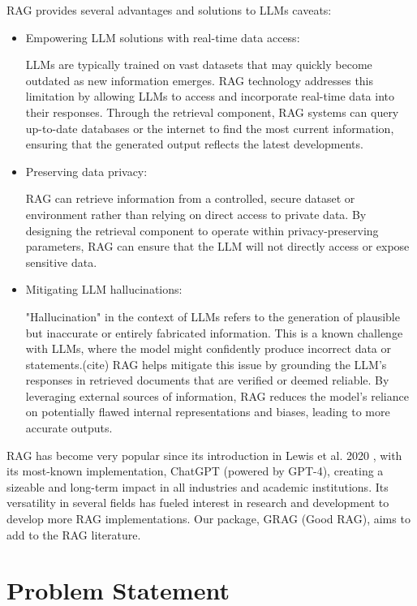 \documentclass{scrartcl}
\begin{document}
RAG provides several advantages and solutions to LLMs caveats:
\begin{itemize}
	\item Empowering LLM solutions with real-time data access:

	LLMs are typically trained on vast datasets that may quickly become outdated as new information emerges. RAG technology addresses this limitation by allowing LLMs to access and incorporate real-time data into their responses. Through the retrieval component, RAG systems can query up-to-date databases or the internet to find the most current information, ensuring that the generated output reflects the latest developments.
	\item Preserving data privacy:

	RAG can retrieve information from a controlled, secure dataset or environment rather than relying on direct access to private data. By designing the retrieval component to operate within privacy-preserving parameters, RAG can ensure that the LLM will not directly access or expose sensitive data.
	\item Mitigating LLM hallucinations:

	"Hallucination" in the context of LLMs refers to the generation of plausible but inaccurate or entirely fabricated information. This is a known challenge with LLMs, where the model might confidently produce incorrect data or statements.(cite) RAG helps mitigate this issue by grounding the LLM's responses in retrieved documents that are verified or deemed reliable. By leveraging external sources of information, RAG reduces the model's reliance on potentially flawed internal representations and biases, leading to more accurate outputs.
\end{itemize}
\newline
RAG has become very popular since its introduction in Lewis et al. 2020 \cite{lewis2021retrievalaugmented}, with its most-known implementation, ChatGPT (powered by GPT-4), creating a sizeable and long-term impact in all industries and academic institutions.
Its versatility in several fields has fueled interest in research and development to develop more RAG implementations. Our package, GRAG (Good RAG), aims to add to the RAG literature.

\section{Problem Statement}
\end{document}
